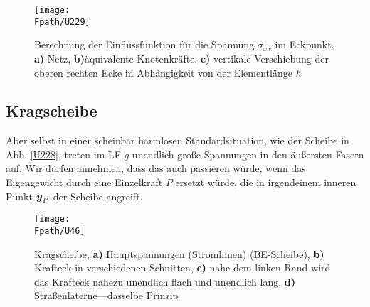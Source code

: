 \begin{figure}
\centering
\texttt{[image: \\Fpath/U229]}
\caption{Berechnung der Einflussfunktion f\"{u}r die Spannung $\sigma_{xx}$ im Eckpunkt,
  \textbf{ a)} Netz,  \textbf{ b)}\"{a}quivalente Knotenkr\"{a}fte, \textbf{ c)} vertikale Verschiebung der oberen rechten Ecke in Abh\"{a}ngigkeit von der Elementl\"{a}nge $h$}
\label{U229}%
\end{figure}%
{\textcolor{sectionTitleBlue}{\section{Kragscheibe}}}
Aber selbst in einer scheinbar harmlosen Standardsituation, wie der Scheibe in Abb. \ref{U228}, treten im LF $g$ unendlich gro{\ss}e Spannungen in den \"{a}u{\ss}ersten Fasern auf. Wir d\"{u}rfen annehmen, dass das auch passieren w\"{u}rde, wenn das Eigengewicht durch eine Einzelkraft $P$ ersetzt w\"{u}rde, die in irgendeinem inneren Punkt $\mbox{\boldmath $y$}_P$ der Scheibe angreift.
\begin{figure}
\centering
{\texttt{[image: \\Fpath/U46]}}
\caption{Kragscheibe, \textbf{ a)} Hauptspannungen (\glq Stromlinien\grq{}) (BE-Scheibe), \textbf{ b)} Krafteck in verschiedenen Schnitten, \textbf{ c)} nahe dem linken Rand wird das Krafteck nahezu unendlich flach und unendlich lang, \textbf{ d)} Stra{\ss}enlaterne---dasselbe Prinzip }
\label{U46}%
\end{figure}%

